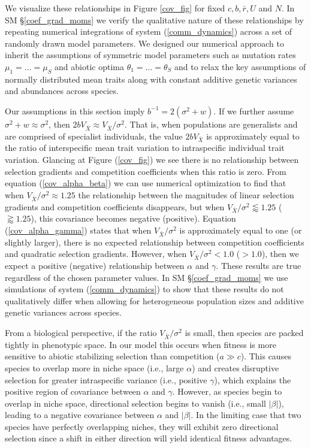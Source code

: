\documentclass[]{elsarticle} %
\begin{document}
We visualize these relationships in Figure \ref{cov_fig} for fixed
\(c,b,\bar r,U\) and \(N\). In SM \S\ref{coef_grad_moms} we verify the
qualitative nature of these relationships by repeating numerical
integrations of system (\ref{comm_dynamics}) across a set of randomly
drawn model parameters. We designed our numerical approach to inherit
the assumptions of symmetric model parameters such as mutation rates
\(\mu_1=\dots=\mu_S\) and abiotic optima \(\theta_1=\dots=\theta_S\) and
to relax the key assumptions of normally distributed mean traits along
with constant additive genetic variances and abundances across species.

Our assumptions in this section imply \(b^{-1}=2(\sigma^2+w)\). If we
further assume \(\sigma^2+w\approx\sigma^2\), then
\(2bV_{\bar X}\approx V_{\bar X}/\sigma^2\). That is, when populations
are generalists and are comprised of specialist individuals, the value
\(2bV_{\bar X}\) is approximately equal to the ratio of interspecific
mean trait variation to intraspecific individual trait variation.
Glancing at Figure (\ref{cov_fig}) we see there is no relationship
between selection gradients and competition coefficients when this ratio
is zero. From equation (\ref{cov_alpha_beta}) we can use numerical
optimization to find that when \(V_{\bar X}/\sigma^2\approx1.25\) the
relationship between the magnitudes of linear selection gradients and
competition coefficients disappears, but when
\(V_{\bar X}/\sigma^2\lessapprox1.25\) (\(\gtrapprox1.25\)), this
covariance becomes negative (positive). Equation (\ref{cov_alpha_gamma})
states that when \(V_{\bar X}/\sigma^2\) is approximately equal to one
(or slightly larger), there is no expected relationship between
competition coefficients and quadratic selection gradients. However,
when \(V_{\bar X}/\sigma^2<1.0\) (\(>1.0\)), then we expect a positive
(negative) relationship between \(\alpha\) and \(\gamma\). These results
are true regardless of the chosen parameter values. In SM
\S\ref{coef_grad_moms} we use simulations of system
(\ref{comm_dynamics}) to show that these results do not qualitatively
differ when allowing for heterogeneous population sizes and additive
genetic variances across species.

From a biological perspective, if the ratio \(V_{\bar X}/\sigma^2\) is
small, then species are packed tightly in phenotypic space. In our model
this occurs when fitness is more sensitive to abiotic stabilizing
selection than competition (\(a\gg c\)). This causes species to overlap
more in niche space (i.e., large \(\alpha\)) and creates disruptive
selection for greater intraspecific variance (i.e., positive
\(\gamma\)), which explains the positive region of covariance between
\(\alpha\) and \(\gamma\). However, as species begin to overlap in niche
space, directional selection begins to vanish (i.e., small \(|\beta|\)),
leading to a negative covariance between \(\alpha\) and \(|\beta|\). In
the limiting case that two species have perfectly overlapping niches,
they will exhibit zero directional selection since a shift in either
direction will yield identical fitness advantages.
\end{document}

